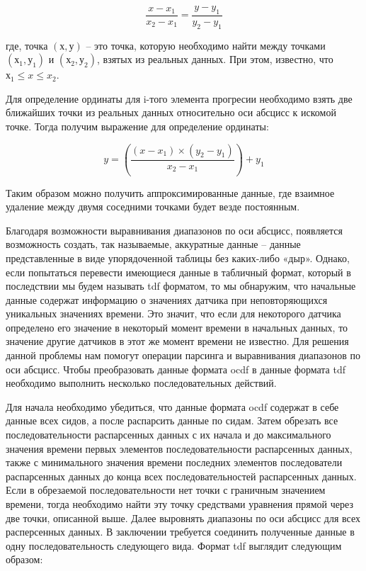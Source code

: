 {  \[\frac{x - x_1}{x_2 - x_1} = \frac{y - y_1}{y_2 - y_1}\]

  где, точка $\left(х, у\right)$ – это точка, которую необходимо найти между точками $\left(х_1, у_1\right)$ и $\left(х_2, у_2\right)$, взятых из реальных данных. При этом, известно, что $х_1 \leq x \leq x_2$. 

  \par \redline Для определение ординаты для i-того элемента прогресии необходимо взять две ближайших точки из реальных данных относительно оси абсцисс к искомой точке. Тогда получим выражение для определение ординаты:

  \[y = \left(\frac{\left(x - x_1\right) \times \left(y_2 - y_1\right)}{x_2 - x_1}\right) + y_1\]

  \par \redline Таким образом можно получить аппроксимированные данные, где взаимное удаление между двумя соседними точками будет везде постоянным.  

  \par \redline Благодаря возможности выравнивания диапазонов по оси абсцисс, появляется возможность создать, так называемые, аккуратные данные – данные представленные в виде упорядоченной таблицы без каких-либо «дыр». Однако, если попытаться перевести имеющиеся данные в табличный формат, который в последствии мы будем называть tdf форматом, то мы обнаружим, что начальные данные содержат информацию о значениях датчика при неповторяющихся уникальных значениях времени. Это значит, что если для некоторого датчика определено его значение в некоторый момент времени в начальных данных, то значение другие датчиков в этот же момент времени не известно. Для решения данной проблемы нам помогут операции парсинга и выравнивания диапазонов по оси абсцисс. Чтобы преобразовать данные формата ocdf в данные формата tdf необходимо выполнить несколько последовательных действий. 

  \par \redline Для начала необходимо убедиться, что данные формата ocdf содержат в себе данные всех сидов, а после распарсить данные по сидам. Затем обрезать все последовательности распарсенных данных с их начала и до максимального значения времени первых элементов последовательности распарсенных данных, также с минимального значения времени последних элементов последователи распарсенных данных до конца всех последовательностей распарсенных данных. Если в обрезаемой последовательности нет точки с граничным значением времени, тогда необходимо найти эту точку средствами уравнения прямой через две точки, описанной выше. Далее выровнять диапазоны по оси абсцисс для всех расперсенных данных. В заключении требуется соединить полученные данные в одну последовательность следующего вида. Формат tdf выглядит следующим образом:

}
